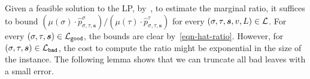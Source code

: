 \documentclass[11pt]{article}
\def\!#1{\mathtt{#1}}
\newcommand{\wh}[1]{\widehat{#1}}
\newcommand{\seqS}{\boldsymbol{s}}
\begin{document}

Given a feasible solution to the LP, by~, to estimate the marginal ratio, it suffices to bound $\left(\mu(\sigma)\cdot \wh{p}_{\sigma, \tau, \seqS}^{\sigma}\right)/\left(\mu(\tau)\cdot\wh{p}_{\sigma, \tau, \seqS}^{\tau}\right)$ for every $(\sigma, \tau, \seqS,v,L) \in \+L$. For every $(\sigma, \tau, \seqS) \in \+L_{\!{good}}$, the bounds are clear by~\eqref{eqn-hat-ratio}. However, for $(\sigma, \tau, \seqS) \in \+L_{\!{bad}}$, the cost to compute the ratio might be exponential in the size of the instance. The following lemma shows that we can truncate all bad leaves with a small error.
\end{document}
